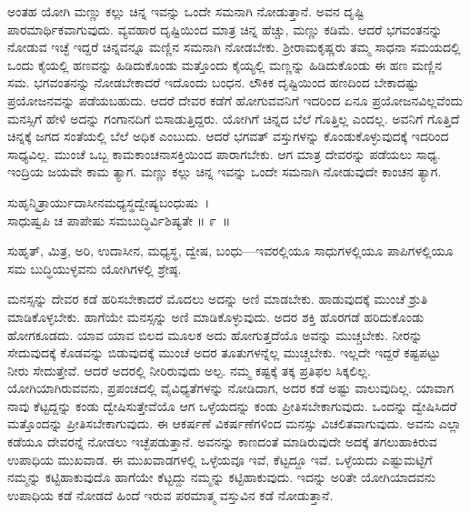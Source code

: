 ಅಂತಹ ಯೋಗಿ ಮಣ್ಣು ಕಲ್ಲು ಚಿನ್ನ ಇವನ್ನು ಒಂದೇ ಸಮನಾಗಿ ನೋಡುತ್ತಾನೆ. ಅವನ ದೃಷ್ಟಿ ಪಾರಮಾರ್ಥಿಕವಾಗುವುದು. ವ್ಯವಹಾರ ದೃಷ್ಟಿಯಿಂದ ಮಾತ್ರ ಚಿನ್ನ ಹೆಚ್ಚು, ಮಣ್ಣು ಕಡಿಮೆ. ಆದರೆ ಭಗವಂತನನ್ನು ನೋಡುವ ಇಚ್ಛೆ ಇದ್ದರೆ ಚಿನ್ನವನ್ನೂ ಮಣ್ಣಿನ ಸಮನಾಗಿ ನೋಡಬೇಕು. ಶ‍್ರೀರಾಮಕೃಷ್ಣರು ತಮ್ಮ ಸಾಧನಾ ಸಮಯದಲ್ಲಿ ಒಂದು ಕೈಯಲ್ಲಿ ಹಣವನ್ನು ಹಿಡಿದುಕೊಂಡು ಮತ್ತೊಂದು ಕೈಯ್ಯಲ್ಲಿ ಮಣ್ಣನ್ನು ಹಿಡಿದುಕೊಂಡು ಈ ಹಣ ಮಣ್ಣಿನ ಸಮ. ಭಗವಂತನನ್ನು ನೋಡಬೇಕಾದರೆ ಇದೊಂದು ಬಂಧನ. ಲೌಕಿಕ ದೃಷ್ಟಿಯಿಂದ ಹಣದಿಂದ ಬೇಕಾದಷ್ಟು ಪ್ರಯೋಜನವನ್ನು ಪಡೆಯಬಹುದು. ಆದರೆ ದೇವರ ಕಡೆಗೆ ಹೋಗುವವನಿಗೆ ಇದರಿಂದ ಏನೂ ಪ್ರಯೋಜನವಿಲ್ಲವೆಂದು ಮನಸ್ಸಿಗೆ ಹೇಳಿ ಅದನ್ನು ಗಂಗಾನದಿಗೆ ಬಿಸಾಡುತ್ತಿದ್ದರು. ಯೋಗಿಗೆ ಚಿನ್ನದ ಬೆಲೆ ಗೊತ್ತಿಲ್ಲ ಎಂದಲ್ಲ. ಅವನಿಗೆ ಗೊತ್ತಿದೆ ಚಿನ್ನಕ್ಕೆ ಜಗದ ಸಂತೆಯಲ್ಲಿ ಬೆಲೆ ಅಧಿಕ ಎಂಬುದು. ಆದರೆ ಭಗವತ್ ವಸ್ತುಗಳನ್ನು ಕೊಂಡುಕೊಳ್ಳುವುದಕ್ಕೆ ಇದರಿಂದ ಸಾಧ್ಯವಿಲ್ಲ. ಮುಂಚೆ ಒಬ್ಬ ಕಾಮಕಾಂಚನಾಸಕ್ತಿಯಿಂದ ಪಾರಾಗಬೇಕು. ಆಗ ಮಾತ್ರ ದೇವರನ್ನು ಪಡೆಯಲು ಸಾಧ್ಯ. ಇಂದ್ರಿಯ ಜಯವೇ ಕಾಮ ತ್ಯಾಗ. ಮಣ್ಣು ಕಲ್ಲು ಚಿನ್ನ ಇವನ್ನು ಒಂದೇ ಸಮನಾಗಿ ನೋಡುವುದೇ ಕಾಂಚನ ತ್ಯಾಗ.

\begin{shloka}
ಸುಹೃನ್ಮಿತ್ರಾರ್ಯುದಾಸೀನಮಧ್ಯಸ್ಥದ್ವೇಷ್ಯಬಂಧುಷು~।\\ಸಾಧುಷ್ವಪಿ ಚ ಪಾಪೇಷು ಸಮಬುದ್ಧಿರ್ವಿಶಿಷ್ಯತೇ \hfill॥ ೯~॥
\end{shloka}

\begin{artha}
ಸುಹೃತ್, ಮಿತ್ರ, ಅರಿ, ಉದಾಸೀನ, ಮಧ್ಯಸ್ಥ, ದ್ವೇಷ, ಬಂಧು—ಇವರಲ್ಲಿಯೂ ಸಾಧುಗಳಲ್ಲಿಯೂ ಪಾಪಿಗಳಲ್ಲಿಯೂ ಸಮ ಬುದ್ಧಿಯುಳ್ಳವನು ಯೋಗಿಗಳಲ್ಲಿ ಶ್ರೇಷ್ಠ.
\end{artha}

ಮನಸ್ಸನ್ನು ದೇವರ ಕಡೆ ಹರಿಸಬೇಕಾದರೆ ಮೊದಲು ಅದನ್ನು ಅಣಿ ಮಾಡಬೇಕು. ಹಾಡುವುದಕ್ಕೆ ಮುಂಚೆ ಶ್ರುತಿ ಮಾಡಿಕೊಳ್ಳಬೇಕು. ಹಾಗೆಯೇ ಮನಸ್ಸನ್ನು ಅಣಿ ಮಾಡಿಕೊಳ್ಳುವುದು. ಅದರ ಶಕ್ತಿ ಹೊರಗಡೆ ಹರಿದುಕೊಂಡು ಹೋಗಕೂಡದು. ಯಾವ ಯಾವ ಬಿಲದ ಮೂಲಕ ಅದು ಹೋಗುತ್ತದೆಯೊ ಅವನ್ನು ಮುಚ್ಚಬೇಕು. ನೀರನ್ನು ಸೇದುವುದಕ್ಕೆ ಕೊಡವನ್ನು ಬಿಡುವುದಕ್ಕೆ ಮುಂಚೆ ಅದರ ತೂತುಗಳನ್ನೆಲ್ಲ ಮುಚ್ಚಬೇಕು. ಇಲ್ಲದೇ ಇದ್ದರೆ ಕಷ್ಟಪಟ್ಟು ನೀರು ಸೇದುತ್ತೇವೆ. ಆದರೆ ಅದರಲ್ಲಿ ನೀರಿರುವುದು ಅಲ್ಪ. ನಮ್ಮ ಕಷ್ಟಕ್ಕೆ ತಕ್ಕ ಪ್ರತಿಫಲ ಸಿಕ್ಕಲಿಲ್ಲ. ಯೋಗಿಯಾಗಿರುವವನು, ಪ್ರಪಂಚದಲ್ಲಿ ವೈವಿಧ್ಯತೆಗಳನ್ನು ನೋಡಿದಾಗ, ಅದರ ಕಡೆ ಅಷ್ಟು ವಾಲುವುದಿಲ್ಲ. ಯಾವಾಗ ನಾವು ಕೆಟ್ಟದ್ದನ್ನು ಕಂಡು ದ್ವೇಷಿಸುತ್ತೇವೆಯೊ ಆಗ ಒಳ್ಳೆಯದನ್ನು ಕಂಡು ಪ್ರೀತಿಸಬೇಕಾಗುವುದು. ಒಂದನ್ನು ದ್ವೇಷಿಸಿದರೆ ಮತ್ತೊಂದನ್ನು ಪ್ರೀತಿಸಬೇಕಾಗುವುದು. ಈ ಆಕರ್ಷಣೆ ವಿಕರ್ಷಣೆಗಳಿಂದ ಮನಸ್ಸು ವಿಚಲಿತವಾಗುವುದು. ಅವನು ಎಲ್ಲಾ ಕಡೆಯೂ ದೇವರನ್ನೆ ನೋಡಲು ಇಚ್ಛೆಪಡುತ್ತಾನೆ. ಅವನನ್ನು ಕಾಣದಂತೆ ಮಾಡಿರುವುದೇ ಅದಕ್ಕೆ ತಗಲುಹಾಕಿರುವ ಉಪಾಧಿಯ ಮುಖವಾಡ. ಈ ಮುಖವಾಡಗಳಲ್ಲಿ ಒಳ್ಳೆಯವೂ ಇವೆ, ಕೆಟ್ಟದ್ದೂ ಇವೆ. ಒಳ್ಳೆಯದು ಎಷ್ಟುಮಟ್ಟಿಗೆ ನಮ್ಮನ್ನು ಕಟ್ಟಿಹಾಕುವುದೊ ಹಾಗೆಯೇ ಕೆಟ್ಟದ್ದು ನಮ್ಮನ್ನು ಕಟ್ಟಿಹಾಕುವುದು. ಇದನ್ನು ಅರಿತೇ ಯೋಗಿಯಾದವನು ಉಪಾಧಿಯ ಕಡೆ ನೋಡದೆ ಹಿಂದೆ ಇರುವ ಪರಮಾತ್ಮ ವಸ್ತುವಿನ ಕಡೆ ನೋಡುತ್ತಾನೆ.

